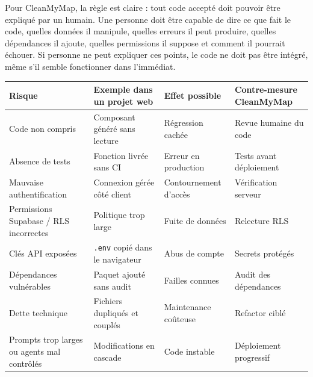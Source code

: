 \documentclass[
  10pt,
  a4paper,
  DIV=11,
  numbers=noendperiod,
  oneside]{scrreprt}
\newcounter{none} %
\begin{document}
Pour CleanMyMap, la règle est claire : tout code accepté doit pouvoir
être expliqué par un humain. Une personne doit être capable de dire ce
que fait le code, quelles données il manipule, quelles erreurs il peut
produire, quelles dépendances il ajoute, quelles permissions il suppose
et comment il pourrait échouer. Si personne ne peut expliquer ces
points, le code ne doit pas être intégré, même s'il semble fonctionner
dans l'immédiat.

{\def\LTcaptype{none} %
\begin{longtable}[]{@{}
  >{\raggedright\arraybackslash}p{}
  >{\raggedright\arraybackslash}p{}
  >{\raggedright\arraybackslash}p{}
  >{\raggedright\arraybackslash}p{}@{}}
\toprule\noalign{}
\begin{minipage}[b]{\linewidth}\raggedright
Risque
\end{minipage} & \begin{minipage}[b]{\linewidth}\raggedright
Exemple dans un projet web
\end{minipage} & \begin{minipage}[b]{\linewidth}\raggedright
Effet possible
\end{minipage} & \begin{minipage}[b]{\linewidth}\raggedright
Contre-mesure CleanMyMap
\end{minipage} \\
\midrule\noalign{}
\endhead
\bottomrule\noalign{}
\endlastfoot
Code non compris & Composant généré sans lecture & Régression cachée &
Revue humaine du code \\
Absence de tests & Fonction livrée sans CI & Erreur en production &
Tests avant déploiement \\
Mauvaise authentification & Connexion gérée côté client & Contournement
d'accès & Vérification serveur \\
Permissions Supabase / RLS incorrectes & Politique trop large & Fuite de
données & Relecture RLS \\
Clés API exposées & \texttt{.env} copié dans le navigateur & Abus de
compte & Secrets protégés \\
Dépendances vulnérables & Paquet ajouté sans audit & Failles connues &
Audit des dépendances \\
Dette technique & Fichiers dupliqués et couplés & Maintenance coûteuse &
Refactor ciblé \\
Prompts trop larges ou agents mal contrôlés & Modifications en cascade &
Code instable & Déploiement progressif \\
\end{longtable}
}
\end{document}
